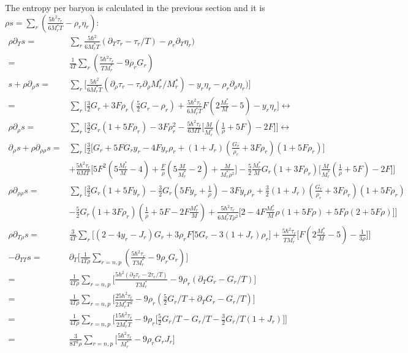 \documentclass[preprint,prc,preprintnumbers,superscriptaddress,amsmath,amssymb,floatfix]{revtex4-1}
\begin{document}
The entropy per baryon is calculated in the previous section and it is $\rho s=\sum_r(\frac{5 \hbar^2\tau_r}{6M_r^{*}T}-\rho_r \eta_r)$:
\begin{equation}
 \begin{split}
 \rho \partial_{T}s=&\sum_r \frac{5 \hbar^2}{6M_r^{*}T}(\partial_T\tau_r-\tau_r/T)-\rho_r\partial_T\eta_r)\\
 =&\frac{1}{4T}\sum_r(\frac{5\hbar^2\tau_r}{TM_r^{*}}-9\rho_r G_r)\\ 
 s+\rho \partial_{\rho}s=&\sum_r\Big[\frac{5 \hbar^2}{6M_r^{*}T}(\partial_{\rho}\tau_r-\tau_r \partial_{\rho}M^{*}_r/M_r^{*})-y_r\eta_r-\rho_r\partial_{\rho}\eta_r)\Big]\\
 =&\sum_r\Big[\frac{3}{2}G_r+3F\rho_r(\frac{5}{2}G_r-\rho_r)+\frac{5\hbar^2\tau_r}{6M_r^{*}T}F(2\frac{M_r^{*}}{M}-5)-y_r\eta_r\Big]\leftrightarrow \\
 \rho \partial_{\rho}s=&\sum_r\Big[\frac{3}{2}G_r(1+5 F \rho_r)-3 F \rho_r^2-\frac{5\hbar^2\tau_r}{6M T}\big[\frac{M}{M_r^{*}}(\frac{1}{\rho}+5 F)-2F\big]\Big]\leftrightarrow \\
 \partial_{\rho}s+\rho \partial_{\rho \rho}s=&\sum_r\Big[\frac{3}{2} \big[{G_r}+5 F {G_r} {y_r}-4 F {y_r} {\rho_r}+(1+{J_r}) (\frac{{G_r}}{{\rho_r}}+3 F {\rho_r}) (1+5 F {\rho_r})\big]\\
 &+\frac{5 \hbar^2\tau_r}{6 M T}\big[5 F^2 (5 \frac{M_r^{*}}{M}-4)+\frac{F}{\rho}(5 \frac{M}{M_r^{*}}-2)+\frac{M}{M_r^{*}\rho^2}\big]-\frac{5}{2}\frac{M_r^{*}}{M}G_r(1+3 F \rho_r)\big[\frac{M}{M_r^{*}}(\frac{1}{\rho}+5 F)-2F\big]  \Big] \\
 \rho \partial_{\rho \rho}s =& \sum_r \Big[\frac{3}{2} {G_r} (1+5 F {y_r})-\frac{3}{2} {G_r}(5 F {y_r}+\frac{1}{\rho })-3 F {y_r} {\rho_r}+\frac{3}{2} (1+{J_r}) (\frac{{G_r}}{{\rho_r}}+3 F {\rho_r}) (1+5 F {\rho_r})\\
 &-\frac{5}{2} G_r (1+ 3 F \rho_r)(\frac{1}{\rho}+5 F-2 F \frac{M_r^{*}}{M})+\frac{5 \hbar^2 \tau_r}{6 M_r^{*} T \rho^2}\big[2-4 F \frac{M_r^{*}}{M}\rho (1+5 F \rho)+5 F \rho (2 + 5 F \rho)\big]\Big]\\
 \rho \partial_{T\rho}s=&\frac{3}{4T}\sum_r\Big[(2-4y_r-J_r)G_r+3\rho_r F\big[5G_r-3(1+J_r)\rho_r\big]+\frac{5\hbar^2\tau_r}{TM_r^{*}}\big[F(2\frac{M^{*}_r}{M}-5)-\frac{1}{3\rho}\big]\Big]\\
-\partial_{TT}s=&\partial_{T}\Big[\frac{1}{4T\rho}\sum_{r={n,p}}(\frac{5\hbar^2\tau_r}{T M_r^{*}}-9\rho_r G_r)\Big]\\
  =&\frac{1}{4T\rho}\sum_{r={n,p}}\big[\frac{5\hbar^2(\partial_T\tau_r-2\tau_r/T)}{TM_r^{*}}-9\rho_r (\partial_TG_r-G_r/T)\big]\\
  =&\frac{1}{4T\rho}\sum_{r={n,p}}\big[\frac{25\hbar^2\tau_r}{2M_r^{*}T^2}-9\rho_r (\frac{5}{2}G_r/T+\partial_TG_r-G_r/T)\big]\\
  =&\frac{1}{4T\rho}\sum_{r={n,p}}\big[\frac{15\hbar^2\tau_r}{2M_r^{*}T}-9\rho_r \big[\frac{5}{2}G_r/T-G_r/T-\frac{3}{2}G_r/T(1+J_r)]\big]\\
  =&\frac{3}{8T^2\rho}\sum_{r={n,p}}\big[\frac{5\hbar^2\tau_r}{M_r^{*}}-9\rho_rG_r J_r\big]\\
 \end{split}
\end{equation}
\end{document}
